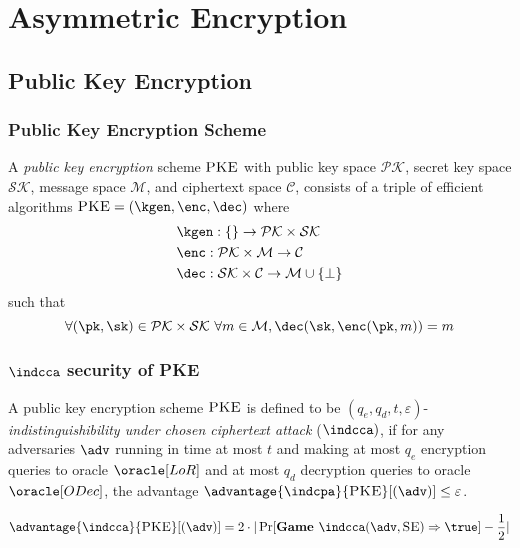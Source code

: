 \documentclass[11pt,a4paper]{article}
\newcommand{\SE}{\textsc{SE}}
\newcommand{\PKE}{\textsc{PKE}}
\begin{document}
\newpage
\section{Asymmetric Encryption}
\subsection{Public Key Encryption}
\subsubsection{Public Key Encryption Scheme}
A \textit{public key encryption} scheme $\textsc{PKE}$ with public key space $\mathcal{PK}$, secret key space $\mathcal{SK}$, message space $\mathcal{M}$, and ciphertext space $\mathcal{C}$, consists of a triple of efficient algorithms $\textsc{PKE} = (\kgen, \enc, \dec)$ where 
$$
\begin{aligned}
&\kgen: \{\} \rightarrow \mathcal{PK} \times \mathcal{SK} \\
&\enc: \mathcal{PK} \times \mathcal{M} \rightarrow \mathcal{C} \\ 
&\dec: \mathcal{SK} \times \mathcal{C} \rightarrow \mathcal{M} \cup \{\bot\} 
\end{aligned}
$$
such that 
$$
\forall (\pk, \sk) \in \mathcal{PK} \times \mathcal{SK} \ \forall m \in \mathcal{M}, \dec(\sk, \enc(\pk, m)) = m
$$



\subsubsection{$\indcca$ security of PKE}
A public key encryption scheme  $\PKE$ is defined to be $(q_e, q_d, t,\varepsilon)$-\textit{indistinguishibility under chosen ciphertext attack} ($\indcca)$, if for any adversaries $\adv$ running in time at most $t$ and making at most $q_e$ encryption queries to oracle $\oracle[LoR]$ and at most $q_d$ decryption queries to oracle $\oracle[ODec]$, the advantage $\advantage{\indcpa}{\PKE}[(\adv)] \leq \varepsilon$.

$$
\advantage{\indcca}{\PKE}[(\adv)] = 2 \cdot | \Pr[\textbf{Game } \indcca(\adv, \SE) \Rightarrow \true ] - \frac{1}{2} | 
$$ 
\end{document}
